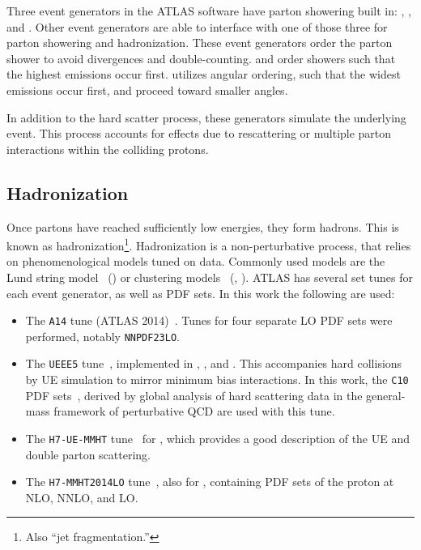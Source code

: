 Three event generators in the ATLAS software have parton showering built in: \PYTHIA, \HERWIG, and \SHERPA. Other event generators are able to interface with one of those three for parton showering and hadronization. These event generators order the parton shower to avoid divergences and double-counting. \PYTHIA and \SHERPA order showers such that the highest \pt emissions occur first. \HERWIG utilizes angular ordering, such that the widest emissions occur first, and proceed toward smaller angles.

In addition to the hard scatter process, these generators simulate the underlying event. This process accounts for effects due to rescattering or multiple parton interactions within the colliding protons.

\subsection{Hadronization}\label{ssec:hadronization}
Once partons have reached sufficiently low energies, they form hadrons. This is known as hadronization\footnote{Also ``jet fragmentation.''}. Hadronization is a non-perturbative process, that relies on phenomenological models tuned on data. Commonly used models are the Lund string model~\cite{lund-string} (\PYTHIA) or clustering models~\cite{clustering-hadronization} (\HERWIG, \SHERPA). ATLAS has several set tunes for each event generator, as well as \gls{PDF} sets. In this work the following are used:

\begin{itemize}
    \item The \texttt{A14} \peight tune (ATLAS 2014)~\cite{a14-tune}. Tunes for four separate \gls{LO} \gls{PDF} sets were performed, notably \texttt{NNPDF23LO}.
    \item The \texttt{UEEE5} tune~\cite{ueee5}, implemented in \HERWIG, \PYTHIA, and \SHERPA. This accompanies hard collisions by \gls{UE} simulation to mirror minimum bias interactions. In this work, the \texttt{C10} \gls{PDF} sets~\cite{c10-pdfs}, derived by global analysis of hard scattering data in the general-mass framework of perturbative \gls{QCD} are used with this tune.
    \item The \texttt{H7-UE-MMHT} tune~\cite{h7-tunes} for \HERWIG, which provides a good description of the \gls{UE} and double parton scattering.
    \item The \texttt{H7-MMHT2014LO} tune~\cite{MMHT2014LO}, also for \HERWIG, containing \gls{PDF} sets of the proton at \gls{NLO}, \gls{NNLO}, and \gls{LO}.
\end{itemize}

